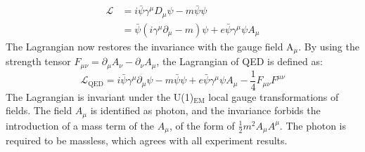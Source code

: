 \begin{equation}
\begin{aligned}
\mathcal{L} &=i \bar{\psi} \gamma^{\mu} D_{\mu} \psi-m \bar{\psi} \psi \\
&=\bar{\psi}\left(i \gamma^{\mu} \partial_{\mu}-m\right) \psi+e \bar{\psi} \gamma^{\mu} \psi A_{\mu}
\end{aligned}
\end{equation}
The Lagrangian now restores the invariance with the gauge field A$_\mu$. By using the strength tensor $F_{\mu \nu}=\partial_{\mu} A_{\nu}-\partial_{\nu} A_{\mu}$, the Lagrangian of QED is defined as:
\begin{equation}
\label{eqn:QEDLagrangian}
\mathcal{L}_{\mathrm{QED}}=i \bar{\psi} \gamma^{\mu} \partial_{\mu} \psi-m \bar{\psi} \psi+e \bar{\psi} \gamma^{\mu} \psi A_{\mu}-\frac{1}{4} F_{\mu \nu} F^{\mu \nu}
\end{equation}
The Lagrangian is invariant under the U(1)$_{\mathrm{EM}}$ local gauge transformations of fields. 
The field $A_\mu$ is identified as photon, and the invariance forbids the introduction of a mass term of the $A_\mu$, of the form of $\frac{1}{2}m^2 A_\mu A^\mu$. The photon is required to be massless, which agrees with all experiment results.
\\

